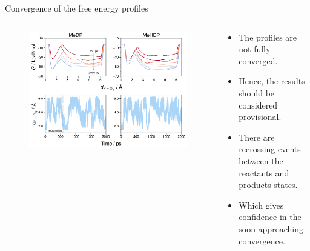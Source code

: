 \documentclass[11pt,t]{beamer}
\begin{document}
\begin{frame}{Convergence of the free energy profiles}
	\begin{columns}[t]
		\begin{column}{.65\textwidth}
			\vspace{-25pt}
			\begin{figure}
				\centering
				\includegraphics[width=1.05\textwidth]{Figures/results_300K_fes_conv_cv_evol.png}
			\end{figure}	
		\end{column}
		\begin{column}{.35\textwidth}
			\vspace{-10pt}
			\small
			\begin{itemize}
				\item The profiles are not fully converged.
				\item Hence, the results should be considered provisional.
				\item There are recrossing events between the reactants and products states.
				\item Which gives confidence in the soon approaching convergence.
			\end{itemize}
		\end{column}
	\end{columns}
\end{frame}
\end{document}
